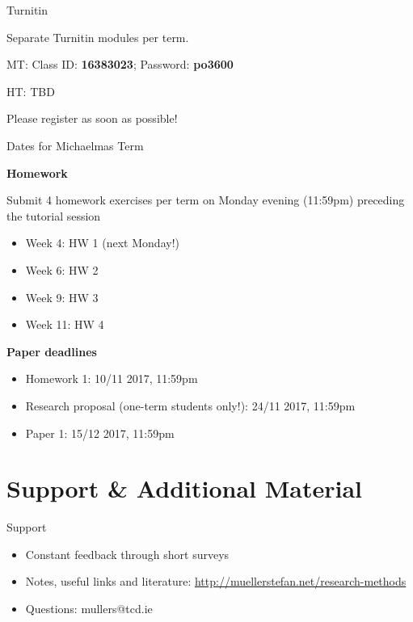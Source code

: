 \documentclass[10pt]{beamer}
\begin{document}
\begin{frame}{Turnitin}

Separate Turnitin modules per term.

MT: Class ID: \textbf{16383023}; Password: \textbf{po3600}

HT: TBD

Please register as soon as possible!
\end{frame}

\begin{frame}{Dates for Michaelmas Term}

\textbf{Homework}

Submit 4 homework exercises per term on Monday evening (11:59pm) preceding the tutorial session

\begin{itemize}
\item Week 4: HW 1 (next Monday!)
\item Week 6: HW 2
\item Week 9: HW 3
\item Week 11: HW 4
\end{itemize}

\textbf{Paper deadlines}

\begin{itemize}
\item Homework 1: 10/11 2017, 11:59pm
\item Research proposal (one-term students only!): 24/11 2017, 11:59pm
\item Paper 1: 15/12 2017, 11:59pm
\end{itemize}

\end{frame}


\section{Support \& Additional Material}

\begin{frame}{Support}

\begin{itemize}
\item Constant feedback through short surveys%
\item Notes, useful links and literature: \url{http://muellerstefan.net/research-methods}
\item Questions: mullers@tcd.ie
\end{itemize}

\end{frame}
\end{document}
